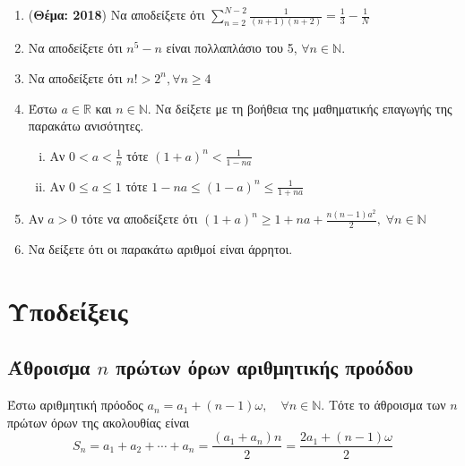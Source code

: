 \begin{enumerate}
    \item \label{ask:thema18sum} ({\bfseries Θέμα: 2018}) Να αποδείξετε ότι 
      $ \sum_{n=2}^{N-2} \frac{1}{(n+1)(n+2)} = \frac{1}{3} - \frac{1}{N} $

    \item Να αποδείξετε ότι $ n^{5} - n $ είναι πολλαπλάσιο του 5,
      $ \forall n \in \mathbb{N} $.

    \item Να αποδείξετε ότι $ n! > 2^{n}, \forall n \geq 4 $

    \item Έστω $ a \in \mathbb{R} $ και $ n \in \mathbb{N} $. Να δείξετε
      με τη βοήθεια της μαθηματικής επαγωγής της παρακάτω ανισότητες.
      \begin{enumerate}[i)]
        \item Αν $ 0<a< \frac{1}{n} $ τότε $ (1+a)^{n} < \frac{1}{1-na} $
        \item Αν $ 0 \leq a \leq 1$  τότε $ 1-na \leq (1-a)^{n} \leq
          \frac{1}{1+na} $
      \end{enumerate}

    \item Αν $a > 0$ τότε να αποδείξετε ότι $ (1+a)^{n} \geq 1 + na + 
      \frac{n(n-1)a^{2}}{2},\; \forall n \in \mathbb{N}   $ 

    \item Να δείξετε ότι οι παρακάτω αριθμοί είναι άρρητοι.
  \end{enumerate}

  \vspace{\baselineskip}

  \section*{Υποδείξεις} 

  \subsection*{Άθροισμα $n$ πρώτων όρων αριθμητικής προόδου}
  Έστω αριθμητική πρόοδος $a_{n} = a_{1} + (n-1)\omega, \quad \forall n \in \mathbb{N}$.
  Τότε το άθροισμα των $n$ πρώτων όρων της ακολουθίας είναι
  \[
    S_{n} = a_{1} + a_{2} + \cdots + a_{n} = \frac{(a_{1} + a_{n})n}{2} =
    \frac{2a_{1}+(n-1)\omega}{2}
  \]
